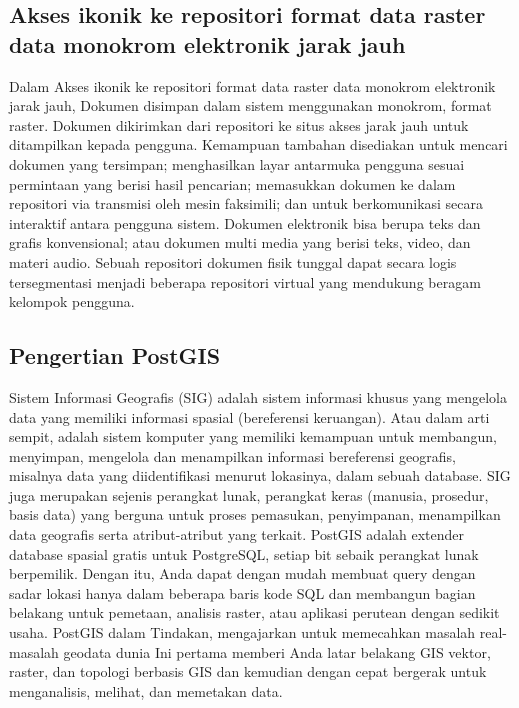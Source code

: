 \begin{enumerate}
\subsection{Akses ikonik ke repositori format data raster data monokrom elektronik jarak jauh}
Dalam Akses ikonik ke repositori format data raster data monokrom elektronik jarak jauh, 
Dokumen disimpan dalam sistem menggunakan monokrom, format raster. 
Dokumen dikirimkan dari repositori ke situs akses jarak jauh untuk ditampilkan kepada pengguna. 
Kemampuan tambahan disediakan untuk mencari dokumen yang tersimpan; 
menghasilkan layar antarmuka pengguna sesuai permintaan yang berisi hasil pencarian; 
memasukkan dokumen ke dalam repositori via transmisi oleh mesin faksimili; 
dan untuk berkomunikasi secara interaktif antara pengguna sistem. 
Dokumen elektronik bisa berupa teks dan grafis konvensional; 
atau dokumen multi media yang berisi teks, video, dan materi audio. 
Sebuah repositori dokumen fisik tunggal dapat secara logis tersegmentasi menjadi
beberapa repositori virtual yang mendukung beragam kelompok pengguna.

\subsection{Pengertian PostGIS}
Sistem Informasi Geografis (SIG) adalah sistem informasi khusus yang mengelola data yang memiliki informasi spasial (bereferensi keruangan). 
Atau dalam arti sempit, adalah sistem komputer yang memiliki kemampuan untuk membangun,
menyimpan, mengelola dan menampilkan informasi bereferensi geografis, misalnya data yang diidentifikasi menurut lokasinya, dalam sebuah database.
SIG juga merupakan sejenis perangkat lunak, perangkat keras (manusia, prosedur, basis data) yang berguna untuk proses pemasukan, penyimpanan, menampilkan data geografis serta atribut-atribut yang terkait.
PostGIS adalah extender database spasial gratis untuk PostgreSQL, 
setiap bit sebaik perangkat lunak berpemilik. Dengan itu, 
Anda dapat dengan mudah membuat query dengan sadar lokasi hanya dalam beberapa baris kode SQL 
dan membangun bagian belakang untuk pemetaan, analisis raster, 
atau aplikasi perutean dengan sedikit usaha. 
PostGIS dalam Tindakan, mengajarkan untuk memecahkan masalah real- 
masalah geodata dunia Ini pertama memberi Anda latar belakang GIS vektor,
raster, dan topologi berbasis GIS dan kemudian dengan cepat bergerak 
untuk menganalisis, melihat, dan memetakan data.


\end{enumerate}
